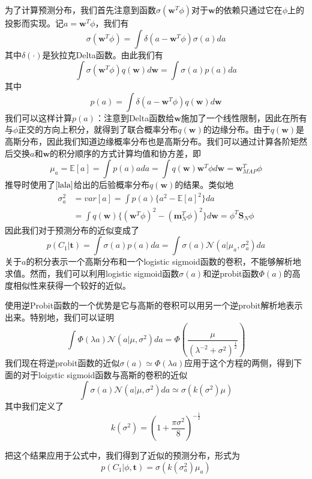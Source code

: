 为了计算预测分布，我们首先注意到函数$\sigma(\boldsymbol{w}^T\phi)$对于$\boldsymbol{w}$的依赖只通过它在$\phi$上的投影而实现。记$a=\boldsymbol{w}^T\phi$，我们有
\begin{equation}
	\sigma(\boldsymbol{w}^T\phi)=\int \delta(a-\boldsymbol{w}^T\phi)\sigma(a)da
\end{equation}
其中$\delta(\cdot)$是狄拉克Delta函数。由此我们有
\begin{equation}
	\int \sigma(\boldsymbol{w}^T\phi)q(\boldsymbol{w})d\boldsymbol{w}=\int \sigma(a)p(a)da
\end{equation}
其中 
\begin{equation}
	p(a)=\int \delta(a-\boldsymbol{w}^T\phi)q(\boldsymbol{w})d\boldsymbol{w}
\end{equation}
我们可以这样计算$p(a)$：注意到Delta函数给$\boldsymbol{w}$施加了一个线性限制，因此在所有与$\phi$正交的方向上积分，就得到了联合概率分布$q(\boldsymbol{w})$的边缘分布。由于$q(\boldsymbol{w})$是高斯分布，因此我们知道边缘概率分布也是高斯分布。我们可以通过计算各阶矩然后交换$a$和$\boldsymbol{w}$的积分顺序的方式计算均值和协方差，即
\begin{equation}
	\mu_a=\mathbb{E}[a]=\int p(a)ada=\int q(\boldsymbol{w})\boldsymbol{w}^T\phi d\boldsymbol{w}=\boldsymbol{w}^T_{MAP}\phi
\end{equation}
推导时使用了$\ref{lala}$给出的后验概率分布$q(\boldsymbol{w})$的结果。类似地
\begin{equation}
\begin{aligned}
	\sigma_a^2&=var[a]=\int p(a)\{a^2-\mathbb{E}[a]^2 \}da\\
	&=\int q(\boldsymbol{w})\{(\boldsymbol{w}^T\phi)^2-(\boldsymbol{m}_N^T\phi)^2\}d\boldsymbol{w}=\phi^T\boldsymbol{S}_N\phi
\end{aligned}
\end{equation}
因此我们对于预测分布的近似变成了
\begin{equation}
	p(C_1|\boldsymbol{t})=\int \sigma(a)p(a)da=\int \sigma(a)\mathcal{N}(a|\mu_a,\sigma_a^2)da
\end{equation}
关于$a$的积分表示一个高斯分布和一个logistic sigmoid函数的卷积，不能够解析地求值。然而，我们可以利用logistic sigmoid函数$\sigma(a)$和逆probit函数$\Phi(a)$的高度相似性来获得一个较好的近似。

使用逆Probit函数的一个优势是它与高斯的卷积可以用另一个逆probit解析地表示出来。特别地，我们可以证明 
\begin{equation}
	\int \Phi(\lambda a)\mathcal{N}(a|\mu,\sigma^2)da=\Phi\left(\frac{\mu}{(\lambda^{-2}+\sigma^2)^{\frac{1}{2}}} \right)
\end{equation}
我们现在将逆probit函数的近似$\sigma(a)\simeq \Phi(\lambda a)$应用于这个方程的两侧，得到下面的对于loigstic sigmoid函数与高斯的卷积的近似
\begin{equation}
	\int \sigma(a)\mathcal{N}(a|\mu,\sigma^2)da\simeq \sigma(k(\sigma^2)\mu)
\end{equation}
其中我们定义了
\begin{equation}
	k(\sigma^2)=(1+\frac{\pi\sigma^2}{8})^{-\frac{1}{2}}
\end{equation}

把这个结果应用于公式中，我们得到了近似的预测分布，形式为
\begin{equation}
\label{jiasup}
	p(C_1|\phi,\boldsymbol{t})=\sigma(k(\sigma_a^2)\mu_a)
\end{equation}